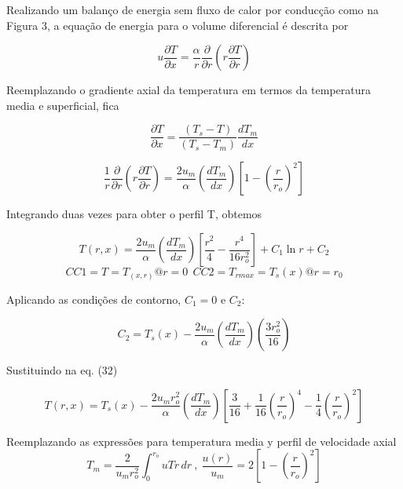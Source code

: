 \documentclass[12pt]{article}
\begin{document}
Realizando um balanço de energia sem fluxo de calor por conducção como na Figura 3, a equação de energia para o volume diferencial é descrita por

\begin{equation}
	u \frac{\partial T}{\partial x} = \frac{\alpha}{r} \frac{\partial}{\partial r} \left( r \frac{\partial T}{\partial r} \right)
\end{equation}

Reemplazando o gradiente axial da temperatura em termos da temperatura media e superficial, fica

\begin{equation}
	 \frac{\partial T}{\partial x} = \frac{(T_s - T)}{(T_s - T_m)} \frac{d T_m}{d x} 
\end{equation}


\begin{equation}
	\frac{1}{r} \frac{\partial}{\partial r} \left( r \frac{\partial T}{\partial r} \right) = \frac{2 u_m}{\alpha} \left( \frac{d T_m}{d x} \right) \left[ 1 - \left( \frac{r}{r_o} \right)^2 \right]
\end{equation}

Integrando duas vezes para obter o perfil T, obtemos

\begin{equation}
	T(r, x) = \frac{2 u_m}{\alpha} \left( \frac{d T_m}{d x} \right) \left[ \frac{r^2}{4} - \frac{r^4}{16 r_o^2} \right] + C_1 \ln r + C_2 	
\end{equation}
\begin{equation}
	CC1 = T = T_{(x,r)} @ r=0	\ \ CC2 = T_{rmax} = T_{s}(x) @ r=r_{0}
\end{equation}

Aplicando as condições de contorno, $C_{1} = 0$ e $C_{2}$:


\begin{equation}
	C_2 = T_s(x) - \frac{2 u_m}{\alpha} \left( \frac{d T_m}{d x} \right) \left( \frac{3 r_o^2}{16} \right)
\end{equation}

Sustituindo na eq. (32)

\begin{equation}
	T(r, x) = T_s(x) - \frac{2 u_m r_o^2}{\alpha} \left( \frac{d T_m}{d x} \right) \left[ \frac{3}{16} + \frac{1}{16} \left( \frac{r}{r_o} \right)^4 - \frac{1}{4} \left( \frac{r}{r_o} \right)^2 \right]
\end{equation}

Reemplazando as expressões para temperatura media y perfil de velocidade axial
\begin{equation}
	T_m = \frac{2}{u_m r_o^2} \int_0^{r_o} u T r \, dr \ , \ \frac{u(r)}{u_m} = 2 \left[ 1 - \left( \frac{r}{r_o} \right)^2 \right]
\end{equation}
\end{document}
